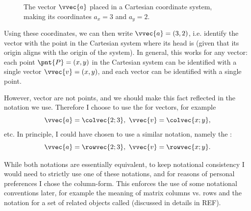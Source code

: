 \begin{figure}
	\begin{center}
	\end{center}
	\caption{The vector $\vvec{a}$ placed in a Cartesian coordinate system, making its coordinates $a_{x}=3$ and $a_{y}=2$.}
	\label{fig:vector in 2D Cartesian system}
\end{figure}

Using these coordinates, we can then write $\vvec{a}=\left(3,2\right)$, i.e. identify the vector with the point in the Cartesian system where its head is (given that its origin aligns with the origin of the system). In general, this works for any vector: each point $\pnt{P}=(x,y)$ in the Cartesian system can be identified with a single vector $\vvec{v}=(x,y)$, and each vector can be identified with a single point.

However, vector are not points, and we should make this fact reflected in the notation we use. Therefore I choose to use the  for vectors, for example
\begin{equation}
	\vvec{a} = \colvec{2;3},\ \vvec{v}=\colvec{x;y},
	\label{eq:first column vectors}
\end{equation}
etc. In principle, I could have chosen to use a similar notation, namely the :
\begin{equation}
	\vvec{a} = \rowvec{2;3},\ \vvec{v}=\rowvec{x;y}.
	\label{eq:first row vectors}
\end{equation}

While both notations are essentially equivalent, to keep notational consistency I would need to strictly use one of these notations, and for reasons of personal preferences I chose the column-form. This enforces the use of some notational conventions later, for example the meaning of matrix columns vs. rows and the notation for a set of related objects called  (discussed in details in REF).

